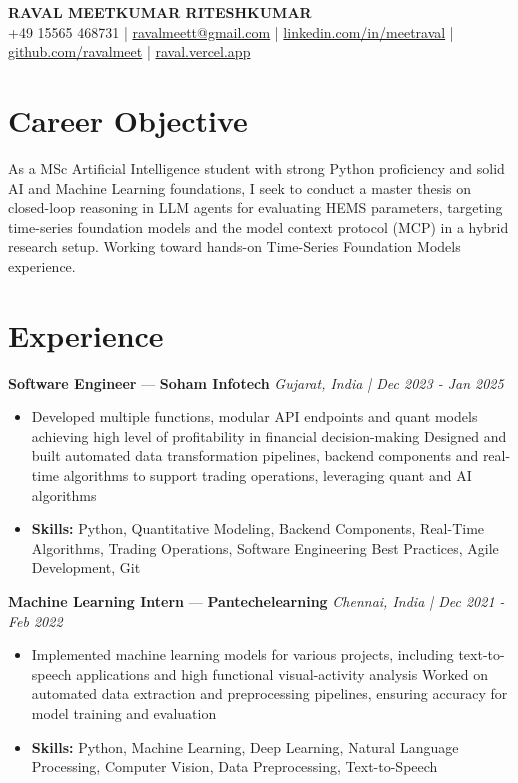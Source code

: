 \documentclass[a4paper,10pt]{article}
\begin{document}
\begin{center}
  {\Large\bfseries RAVAL MEETKUMAR RITESHKUMAR}\\[2pt]
  {\small +49 15565 468731 \;|\; \href{mailto:ravalmeett@gmail.com}{ravalmeett@gmail.com} \;|\; \href{https://www.linkedin.com/in/meetraval/}{linkedin.com/in/meetraval} \;|\; \href{https://github.com/ravalmeet}{github.com/ravalmeet} \;|\; \href{https://raval.vercel.app/}{raval.vercel.app}}
\end{center}
\vspace{-3pt}

\section*{Career Objective}
As a MSc Artificial Intelligence student with strong Python proficiency and solid AI and Machine Learning foundations, I seek to conduct a master thesis on closed-loop reasoning in LLM agents for evaluating HEMS parameters, targeting time-series foundation models and the model context protocol (MCP) in a hybrid research setup. Working toward hands-on Time-Series Foundation Models experience.\par

\section*{Experience}
\textbf{Software Engineer} — \textbf{Soham Infotech} \hfill \textit{Gujarat, India \;|\; Dec 2023 - Jan 2025}\par
\vspace{1pt}
\begin{itemize}
  \item Developed multiple functions, modular API endpoints and quant models achieving high level of profitability in financial decision-making Designed and built automated data transformation pipelines, backend components and real-time algorithms to support trading operations, leveraging quant and AI algorithms
  \item \textbf{Skills:} Python, Quantitative Modeling, Backend Components, Real-Time Algorithms, Trading Operations, Software Engineering Best Practices, Agile Development, Git
\end{itemize}
\vspace{3pt}
\textbf{Machine Learning Intern} — \textbf{Pantechelearning} \hfill \textit{Chennai, India \;|\; Dec 2021 - Feb 2022}\par
\vspace{1pt}
\begin{itemize}
  \item Implemented machine learning models for various projects, including text-to-speech applications and high functional visual-activity analysis Worked on automated data extraction and preprocessing pipelines, ensuring accuracy for model training and evaluation
  \item \textbf{Skills:} Python, Machine Learning, Deep Learning, Natural Language Processing, Computer Vision, Data Preprocessing, Text-to-Speech
\end{itemize}
\end{document}
